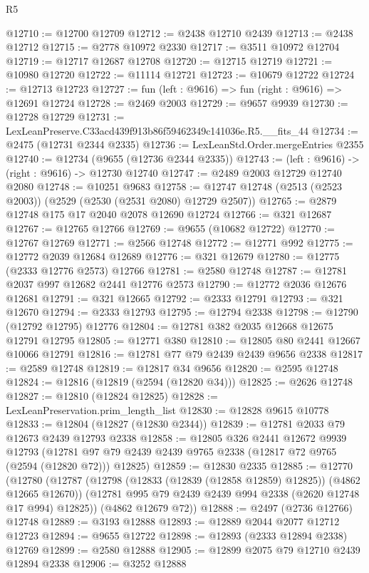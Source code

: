 \begin{lexlean}{R5}
\begin{coremodule}
@12710 := @12700 @12709
@12712 := @2438 @12710 @2439
@12713 := @2438 @12712
@12715 := @2778 @10972 @2330
@12717 := @3511 @10972 @12704
@12719 := @12717 @12687 @12708
@12720 := @12715 @12719
@12721 := @10980 @12720
@12722 := @11114 @12721
@12723 := @10679 @12722
@12724 := @12713 @12723
@12727 := fun (left : @9616) => fun (right : @9616) => @12691 @12724
@12728 := @2469 @2003
@12729 := @9657 @9939
@12730 := @12728 @12729
@12731 := LexLeanPreserve.C33acd439f913b86f59462349c141036e.R5.__fits_44
@12734 := @2475 (@12731 @2344 @2335)
@12736 := LexLeanStd.Order.mergeEntries @2355
@12740 := @12734 (@9655 (@12736 @2344 @2335))
@12743 := (left : @9616) -> (right : @9616) -> @12730 @12740
@12747 := @2489 @2003 @12729 @12740 @2080
@12748 := @10251 @9683
@12758 := @12747 @12748 (@2513 (@2523 @2003)) (@2529 (@2530 (@2531 @2080) @12729 @2507))
@12765 := @2879 @12748 @175 @17 @2040 @2078 @12690 @12724
@12766 := @321 @12687
@12767 := @12765 @12766
@12769 := @9655 (@10682 @12722)
@12770 := @12767 @12769
@12771 := @2566 @12748
@12772 := @12771 @992
@12775 := @12772 @2039 @12684 @12689
@12776 := @321 @12679
@12780 := @12775 (@2333 @12776 @2573) @12766
@12781 := @2580 @12748
@12787 := @12781 @2037 @997 @12682 @2441 @12776 @2573
@12790 := @12772 @2036 @12676 @12681
@12791 := @321 @12665
@12792 := @2333 @12791
@12793 := @321 @12670
@12794 := @2333 @12793
@12795 := @12794 @2338
@12798 := @12790 (@12792 @12795) @12776
@12804 := @12781 @382 @2035 @12668 @12675 @12791 @12795
@12805 := @12771 @380
@12810 := @12805 @80 @2441 @12667 @10066 @12791
@12816 := @12781 @77 @79 @2439 @2439 @9656 @2338
@12817 := @2589 @12748
@12819 := @12817 @34 @9656
@12820 := @2595 @12748
@12824 := @12816 (@12819 (@2594 (@12820 @34)))
@12825 := @2626 @12748
@12827 := @12810 (@12824 @12825)
@12828 := LexLeanPreservation.prim_length_list
@12830 := @12828 @9615 @10778
@12833 := @12804 (@12827 (@12830 @2344))
@12839 := @12781 @2033 @79 @12673 @2439 @12793 @2338
@12858 := @12805
    @326
    @2441
    @12672
    @9939
    @12793
    (@12781 @97 @79 @2439 @2439 @9765 @2338 (@12817 @72 @9765 (@2594 (@12820 @72))) @12825)
@12859 := @12830 @2335
@12885 := @12770
    (@12780
      (@12787
        (@12798 (@12833 (@12839 (@12858 @12859) @12825)) (@4862 @12665 @12670))
        (@12781 @995 @79 @2439 @2439 @994 @2338 (@2620 @12748 @17 @994) @12825))
      (@4862 @12679 @72))
@12888 := @2497 (@2736 @12766) @12748
@12889 := @3193 @12888
@12893 := @12889 @2044 @2077 @12712 @12723
@12894 := @9655 @12722
@12898 := @12893 (@2333 @12894 @2338) @12769
@12899 := @2580 @12888
@12905 := @12899 @2075 @79 @12710 @2439 @12894 @2338
@12906 := @3252 @12888

\end{coremodule}
\end{lexlean}
